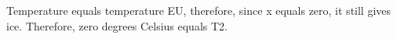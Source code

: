 Temperature equals temperature EU, therefore, since x equals zero, it still gives ice. Therefore, zero degrees Celsius equals T2.